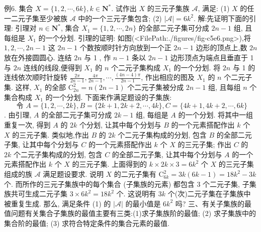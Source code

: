 例6. 集合 $X=\{1,2, \cdots, 6 k\}, k \in \mathbf{N}^*$. 试作出 $X$ 的三元子集族 $\mathscr{A}$, 满足:
(1) $X$ 的任一二元子集至少被族 $\mathscr{A}$ 中的一个三元子集包含;
(2) $|\mathscr{A}|=6 k^2$.
解:先证明下面的引理:
引理对 $n \in \mathbf{N}^*$, 集合 $X_1=\{1,2, \cdots, 2 n\}$ 的全部二元子集可分成 $2 n-1$ 组, 且每组是 $X_1$ 的一个分划.
引理的证明: 如图(<FilePath:./figures/fig-c5e6.png>),将 $1,2, \cdots, 2 n-1$ 这 $2 n-1$ 个数按顺时针方向放到一个正 $2 n-1$ 边形的顶点上,数 $2 n$ 放在外接圆圆心.
连结 $2 n$ 与 1 , 作 $n-1$ 条以 $2 n-1$ 边形顶点为端点且垂直于 1 与 $2 n$ 连线的线段,便得到 $X_1$ 的 $n$ 个二元子集构成 $X_1$ 的一个分划.
将 $2 n$ 与 1 的连线依次顺时针旋转 $\frac{2 \pi}{2 n-1}, \frac{4 \pi}{2 n-1}, \cdots, \frac{(4 n-4) \pi}{2 n-1}$, 作出相应的图及
$X_1$ 的 $n$ 个二元子集.
这样, $X_1$ 的全部 $\mathrm{C}_{2 n}^2=n(2 n-1)$ 个二元子集被分成 $2 n-1$ 组, 且每组 $n$ 个集合构成 $X_1$ 的一个分划.
下面来作满足题设的子集族:
$$
\text { 令 } A=\{1,2, \cdots, 2 k\}, B=\{2 k+1,2 k+2, \cdots, 4 k\}, C=\{4 k+1 ,4 k+2, \cdots, 6 k\}
$$. 
由引理, $A$ 的全部二元子集可分成 $2 k-1$ 组, 每组是 $A$ 的一个分划.
将其中一组重复一次, 得到 $A$ 的 $2 k$ 个分划, 让其中每个分划与 $B$ 的一个元素搭配作出 $k$ 个 $X$ 的三元子集.
类似地,作出 $B$ 的 $2 k$ 个二元子集构成的分划, 包含 $B$ 的全部二元子集, 让其中每个分划与 $C$ 的一个元素搭配作出 $k$ 个 $X$ 的三元子集; 作出 $C$ 的 $2 k$ 个二元子集构成的分划, 包含 $C$ 的全部二元子集, 让其中每个分划与 $A$ 的一个元素搭配作出 $k$ 个 $X$ 的三元子集.
上面得到的 $k \times 2 k \times 3=6 k^2$ 个 $X$ 的三元子集组成的族 $\mathscr{A}$ 满足题设要求.
说明 $X$ 的二元子集有 $\mathrm{C}_{6 k}^2=3 k(6 k-1)=18 k^2-3 k$ 个.
而所作的三元子集族中的每个集合 (子集族的元素) 都包含 3 个二元子集, 子集族共可生成二元子集 $3 \times 6 k^2=18 k^2$ 个.
这说明有 $3 k$ 个(次)二元子集在子集族中被重复生成.
那么, 满足条件 (1) 的 $|\mathcal{A}|$ 的最小值是 $6 k^2$ 吗?
三、有关子集族的最值问题有关集合子集族的最值主要有三类:(1)求子集族阶的最值; (2) 求子集族中的集合阶的最值; (3) 求符合特定条件的集合元素的最值.



